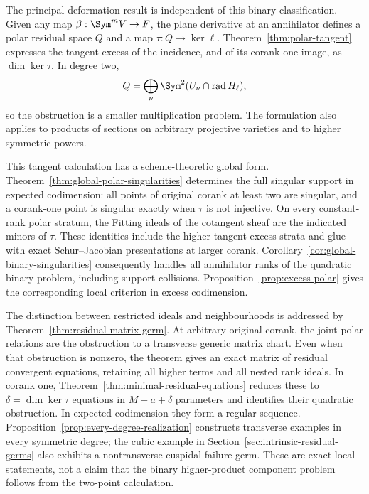 The principal deformation result is independent of this binary
classification. Given any map $\beta:\Sym^m V\to F$, the plane
derivative at an annihilator defines a polar residual space $Q$ and
a map $\tau:Q\to\ker\ell$. Theorem~\ref{thm:polar-tangent}
expresses the tangent excess of the incidence, and of its corank-one
image, as $\dim\ker\tau$. In degree two,
\[
 Q=\bigoplus_\nu\Sym^2(U_\nu\cap\operatorname{rad}H_\ell),
\]
so the obstruction is a smaller multiplication problem. The formulation
also applies to products of sections on arbitrary projective varieties
and to higher symmetric powers.

This tangent calculation has a scheme-theoretic global form.
Theorem~\ref{thm:global-polar-singularities} determines the full
singular support in expected codimension: all points of original
corank at least two are singular, and a corank-one point is singular
exactly when $\tau$ is not injective. On every constant-rank polar
stratum, the Fitting ideals of the cotangent sheaf are the indicated
minors of $\tau$. These identities include the higher tangent-excess
strata and glue with exact Schur--Jacobian presentations at larger
corank. Corollary~\ref{cor:global-binary-singularities} consequently
handles all annihilator ranks of the quadratic binary problem,
including support collisions. Proposition~\ref{prop:excess-polar}
gives the corresponding local criterion in excess codimension.

The distinction between restricted ideals and neighbourhoods is addressed
by Theorem~\ref{thm:residual-matrix-germ}. At arbitrary original corank,
the joint polar relations are the obstruction to a transverse generic
matrix chart. Even when that obstruction is nonzero, the theorem gives
an exact matrix of residual convergent equations, retaining all higher
terms and all nested rank ideals. In corank one,
Theorem~\ref{thm:minimal-residual-equations} reduces these to
$\delta=\dim\ker\tau$ equations in $M-a+\delta$ parameters and
identifies their quadratic obstruction. In expected codimension they
form a regular sequence. Proposition~\ref{prop:every-degree-realization}
constructs transverse examples in every symmetric degree; the cubic
example in Section~\ref{sec:intrinsic-residual-germs} also exhibits a
nontransverse cuspidal failure germ. These are exact local statements,
not a claim that the binary higher-product component problem follows
from the two-point calculation.

